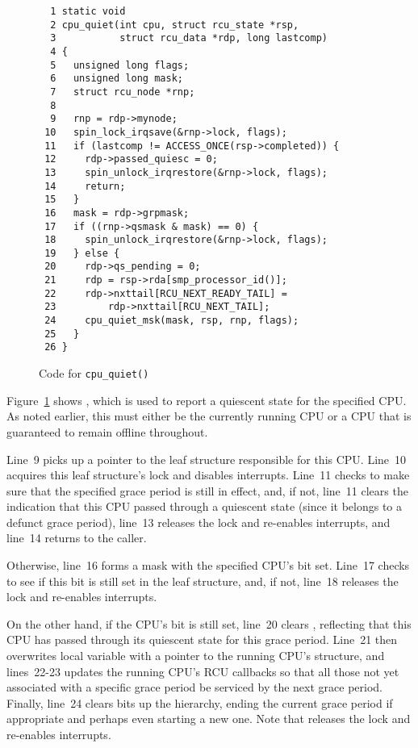 \begin{figure}[tbp]
{ \scriptsize
\begin{verbatim}
  1 static void
  2 cpu_quiet(int cpu, struct rcu_state *rsp,
  3           struct rcu_data *rdp, long lastcomp)
  4 {
  5   unsigned long flags;
  6   unsigned long mask;
  7   struct rcu_node *rnp;
  8
  9   rnp = rdp->mynode;
 10   spin_lock_irqsave(&rnp->lock, flags);
 11   if (lastcomp != ACCESS_ONCE(rsp->completed)) {
 12     rdp->passed_quiesc = 0;
 13     spin_unlock_irqrestore(&rnp->lock, flags);
 14     return;
 15   }
 16   mask = rdp->grpmask;
 17   if ((rnp->qsmask & mask) == 0) {
 18     spin_unlock_irqrestore(&rnp->lock, flags);
 19   } else {
 20     rdp->qs_pending = 0;
 21     rdp = rsp->rda[smp_processor_id()];
 22     rdp->nxttail[RCU_NEXT_READY_TAIL] =
 23         rdp->nxttail[RCU_NEXT_TAIL];
 24     cpu_quiet_msk(mask, rsp, rnp, flags);
 25   }
 26 }
\end{verbatim}
}
\caption{Code for {\tt cpu\_quiet()}}
\label{fig:app:rcuimpl:rcutreewt:Code for cpu-quiet}
\end{figure}

Figure~\ref{fig:app:rcuimpl:rcutreewt:Code for cpu-quiet}
shows , which is used to report a quiescent state
for the specified CPU.
As noted earlier, this must either be the currently running CPU
or a CPU that is guaranteed to remain offline throughout.

Line~9 picks up a pointer to the leaf  structure
responsible for this CPU.
Line~10 acquires this leaf  structure's lock and
disables interrupts.
Line~11 checks to make sure that the specified grace period is
still in effect, and, if not, line~11 clears the indication that
this CPU passed through a quiescent state (since it belongs to
a defunct grace period), line~13 releases the lock and re-enables
interrupts, and line~14 returns to the caller.

Otherwise, line~16 forms a mask with the specified CPU's bit set.
Line~17 checks to see if this bit is still set in the leaf
 structure, and, if not, line~18 releases the lock
and re-enables interrupts.

On the other hand, if the CPU's bit is still set, line~20 clears
, reflecting that this CPU has passed through
its quiescent state for this grace period.
Line~21 then overwrites local variable  with a pointer to
the running CPU's  structure, and lines~22-23
updates the running CPU's RCU callbacks so that all those not yet
associated with a specific grace period
be serviced by the next grace period.
Finally, line~24 clears bits up the  hierarchy,
ending the current grace period if appropriate and perhaps even
starting a new one.
Note that  releases the lock and re-enables interrupts.

